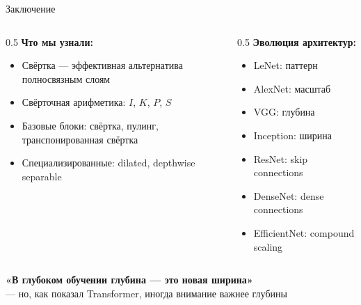 \documentclass[aspectratio=169, 9pt]{beamer}
\begin{document}
\begin{frame}{Заключение}
  \begin{columns}[T]
    \begin{column}{0.5\textwidth}
      \textbf{Что мы узнали:}
      \begin{itemize}
        \item Свёртка — эффективная альтернатива полносвязным слоям
        \item Свёрточная арифметика: $I$, $K$, $P$, $S$
        \item Базовые блоки: свёртка, пулинг, транспонированная свёртка
        \item Специализированные: dilated, depthwise separable
      \end{itemize}
    \end{column}
    \begin{column}{0.5\textwidth}
      \textbf{Эволюция архитектур:}
      \begin{itemize}
        \item LeNet: паттерн
        \item AlexNet: масштаб
        \item VGG: глубина
        \item Inception: ширина
        \item ResNet: skip connections
        \item DenseNet: dense connections
        \item EfficientNet: compound scaling
      \end{itemize}
    \end{column}
  \end{columns}
  
  \vspace{1em}
  \begin{center}
    \textcolor{blue!70!black}{\textbf{«В глубоком обучении глубина — это новая ширина»}} \\
    \tiny{— но, как показал Transformer, иногда внимание важнее глубины}
  \end{center}
\end{frame}
\end{document}
